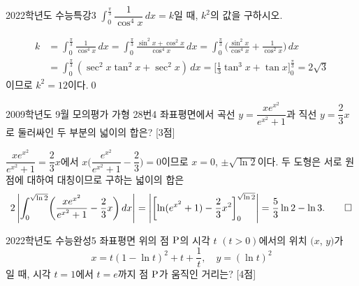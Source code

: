 \documentclass{article}
\begin{document}
\newpage
\begin{prob}{2022학년도 수능특강}{3}
	$\displaystyle\int_0^{\tfrac{\pi}{3}}\dfrac{1}{\cos^4x}\,dx=k$일 때, $k^2$의 값을 구하시오.	
\end{prob}

\begin{sol}
	\[
		\begin{aligned}
			k&=\int_0^{\tfrac{\pi}{3}}\frac{1}{\cos^4x}\,dx=\int_0^{\tfrac{\pi}{3}}\frac{\sin^2x+\cos^2x}{\cos^4x}\,dx=\int_0^{\tfrac{\pi}{3}}\biggl(\frac{\sin^2x}{\cos^4x}+\frac{1}{\cos^2x}\biggr)\,dx\\[3pt]
			&=\int_0^{\tfrac{\pi}{3}}(\sec^2x\tan^2x+\sec^2x)\,dx=\biggl[\frac{1}{3}\tan^3x+\tan x\biggr]_0^{\tfrac{\pi}{3}}=2\sqrt3
		\end{aligned}
	\]
	이므로 $k^2=12$이다.\qed
\end{sol}

\newpage
\begin{prob}{2009학년도 9월 모의평가 가형 28번}{4}
	좌표평면에서 곡선 $y=\dfrac{xe^{x^2}}{e^{x^2}+1}$과 직선 $y=\dfrac{2}{3}x$로 둘러싸인 두 부분의 넓이의 합은? [3점]
\end{prob}

\begin{sol}
	$\dfrac{xe^{x^2}}{e^{x^2}+1}=\dfrac{2}{3}x$에서 $x\biggl(\dfrac{e^{x^2}}{e^{x^2}+1}-\dfrac{2}{3}\biggr)=0$이므로 $x=0$, $\pm\sqrt{\ln2}$이다. 두 도형은 서로 원점에 대하여 대칭이므로 구하는 넓이의 합은
	\[
		2\left\vert\int_0^{\sqrt{\ln2}}\biggl(\frac{xe^{x^2}}{e^{x^2}+1}-\frac{2}{3}x\biggr)\,dx\right\vert=\left\vert\biggl[\ln(e^{x^2}+1)-\frac{2}{3}x^2\biggr]_0^{\sqrt{\ln2}}\right\vert=\frac{5}{3}\ln2-\ln3.\qed
	\]
\end{sol}

\newpage
\begin{prob}{2022학년도 수능완성}{5}
	좌표평면 위의 점 $\rm P$의 시각 $t$ $(t>0)$에서의 위치 $(x$, $y)$가
	\[
		x=t(1-\ln t)^2+t+\frac{1}{t},\quad y=(\ln t)^2
	\]
	일 때, 시각 $t=1$에서 $t=e$까지 점 $\rm P$가 움직인 거리는? [4점]
\end{prob}
\end{document}
